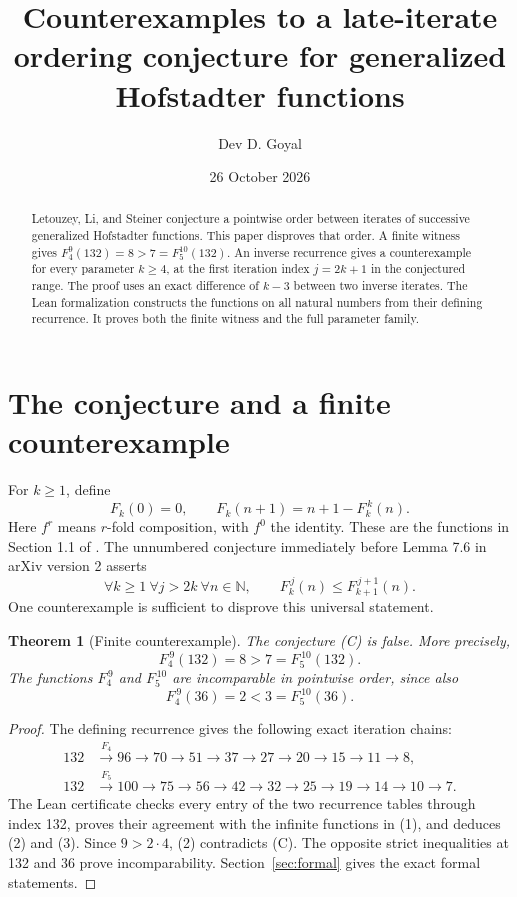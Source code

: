 \documentclass[11pt,a4paper]{article}
\title{Counterexamples to a late-iterate ordering conjecture for generalized Hofstadter functions}
\author{Dev D. Goyal}
\date{26 October 2026}
\newtheorem{theorem}{Theorem}
\newcommand{\N}{\mathbb N}
\newcommand{\itf}[2]{F_{#1}^{\,#2}}
\begin{document}
\maketitle
\begin{abstract}
Letouzey, Li, and Steiner conjecture a pointwise order between iterates
of successive generalized Hofstadter functions. This paper disproves that
order. A finite witness gives $F_4^9(132)=8>7=F_5^{10}(132)$.
An inverse recurrence gives a counterexample for every parameter $k\geq4$,
at the first iteration index $j=2k+1$ in the conjectured range.
The proof uses an exact difference of $k-3$ between two inverse iterates.
The Lean formalization constructs the functions on all natural numbers
from their defining recurrence. It proves both the finite witness and
the full parameter family.
\end{abstract}
\section{The conjecture and a finite counterexample}

For \(k\ge1\), define
\[
 F_k(0)=0,\qquad F_k(n+1)=n+1-\itf{k}{k}(n).
 \tag{1}
\]
Here \(f^r\) means \(r\)-fold composition, with \(f^0\) the identity.
These are the functions in Section 1.1 of \cite{LLS}.
The unnumbered conjecture immediately before Lemma 7.6 in arXiv version 2
asserts
\[
 \forall k\ge1\ \forall j>2k\ \forall n\in\N,
 \qquad \itf{k}{j}(n)\le\itf{k+1}{j+1}(n).
 \tag{C}
\]
One counterexample is sufficient to disprove this universal statement.

\begin{theorem}[Finite counterexample]
The conjecture \textup{(C)} is false. More precisely,
\[
 \boxed{\itf{4}{9}(132)=8>7=\itf{5}{10}(132).}
 \tag{2}
\]
The functions \(\itf{4}{9}\) and \(\itf{5}{10}\) are incomparable in pointwise
order, since also
\[
 \itf{4}{9}(36)=2<3=\itf{5}{10}(36).
 \tag{3}
\]
\end{theorem}

\begin{proof}
The defining recurrence gives the following exact iteration chains:
\begin{align*}
132&\xrightarrow{F_4}96\to70\to51\to37\to27\to20\to15\to11\to8,\\
132&\xrightarrow{F_5}100\to75\to56\to42\to32\to25\to19\to14\to10\to7.
\end{align*}
The Lean certificate checks every entry of the two recurrence tables through
index 132, proves their agreement with the infinite functions in (1), and
deduces (2) and (3). Since \(9>2\cdot4\), (2) contradicts (C).
The opposite strict inequalities at 132 and 36 prove incomparability.
Section~\ref{sec:formal} gives the exact formal statements.
\end{proof}
\end{document}
